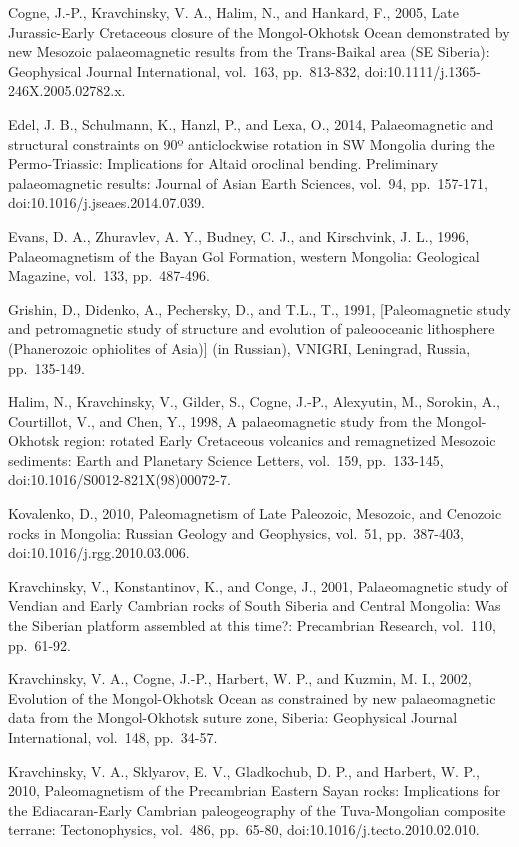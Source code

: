\documentclass[11pt]{article}
\begin{document}
Cogne, J.-P., Kravchinsky, V. A., Halim, N., and Hankard, F., 2005, Late
Jurassic-Early Cretaceous closure of the Mongol-Okhotsk Ocean
demonstrated by new Mesozoic palaeomagnetic results from the
Trans-Baikal area (SE Siberia): Geophysical Journal International,
vol.~163, pp.~813-832, doi:10.1111/j.1365-246X.2005.02782.x.

Edel, J. B., Schulmann, K., Hanzl, P., and Lexa, O., 2014,
Palaeomagnetic and structural constraints on 90º anticlockwise rotation
in SW Mongolia during the Permo-Triassic: Implications for Altaid
oroclinal bending. Preliminary palaeomagnetic results: Journal of Asian
Earth Sciences, vol.~94, pp.~157-171, doi:10.1016/j.jseaes.2014.07.039.

Evans, D. A., Zhuravlev, A. Y., Budney, C. J., and Kirschvink, J. L.,
1996, Palaeomagnetism of the Bayan Gol Formation, western Mongolia:
Geological Magazine, vol.~133, pp.~487-496.

Grishin, D., Didenko, A., Pechersky, D., and T.L., T., 1991,
{[}Paleomagnetic study and petromagnetic study of structure and
evolution of paleooceanic lithosphere (Phanerozoic ophiolites of
Asia){]} (in Russian), VNIGRI, Leningrad, Russia, pp.~135-149.

Halim, N., Kravchinsky, V., Gilder, S., Cogne, J.-P., Alexyutin, M.,
Sorokin, A., Courtillot, V., and Chen, Y., 1998, A palaeomagnetic study
from the Mongol-Okhotsk region: rotated Early Cretaceous volcanics and
remagnetized Mesozoic sediments: Earth and Planetary Science Letters,
vol.~159, pp.~133-145, doi:10.1016/S0012-821X(98)00072-7.

Kovalenko, D., 2010, Paleomagnetism of Late Paleozoic, Mesozoic, and
Cenozoic rocks in Mongolia: Russian Geology and Geophysics, vol.~51,
pp.~387-403, doi:10.1016/j.rgg.2010.03.006.

Kravchinsky, V., Konstantinov, K., and Conge, J., 2001, Palaeomagnetic
study of Vendian and Early Cambrian rocks of South Siberia and Central
Mongolia: Was the Siberian platform assembled at this time?: Precambrian
Research, vol.~110, pp.~61-92.

Kravchinsky, V. A., Cogne, J.-P., Harbert, W. P., and Kuzmin, M. I.,
2002, Evolution of the Mongol-Okhotsk Ocean as constrained by new
palaeomagnetic data from the Mongol-Okhotsk suture zone, Siberia:
Geophysical Journal International, vol.~148, pp.~34-57.

Kravchinsky, V. A., Sklyarov, E. V., Gladkochub, D. P., and Harbert, W.
P., 2010, Paleomagnetism of the Precambrian Eastern Sayan rocks:
Implications for the Ediacaran-Early Cambrian paleogeography of the
Tuva-Mongolian composite terrane: Tectonophysics, vol.~486, pp.~65-80,
doi:10.1016/j.tecto.2010.02.010.
\end{document}
